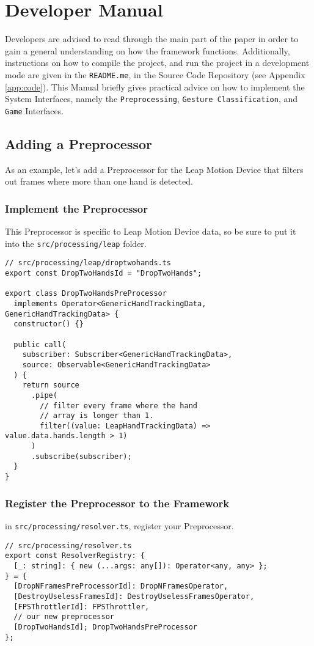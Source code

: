 \chapter{Developer Manual}
Developers are advised to read through the main part of the paper in order to gain a general understanding on how the framework functions. Additionally, instructions on how to compile the project, and run the project in a development mode are given in the \texttt{README.me}, in the Source Code Repository (see Appendix \ref{app:code}). This Manual briefly gives practical advice on how to implement the System Interfaces, namely the \texttt{Preprocessing}, \texttt{Gesture Classification}, and \texttt{Game} Interfaces.
\section{Adding a Preprocessor}
As an example, let's add a Preprocessor for the Leap Motion Device that filters out frames where more than one hand is detected.
\subsection{Implement the Preprocessor}
This Preprocessor is specific to Leap Motion Device data, so be sure to put it into the \texttt{src/processing/leap} folder.
\begin{verbatim}
// src/processing/leap/droptwohands.ts
export const DropTwoHandsId = "DropTwoHands";

export class DropTwoHandsPreProcessor
  implements Operator<GenericHandTrackingData, GenericHandTrackingData> {
  constructor() {}

  public call(
    subscriber: Subscriber<GenericHandTrackingData>,
    source: Observable<GenericHandTrackingData>
  ) {
    return source
      .pipe(
        // filter every frame where the hand
        // array is longer than 1.
        filter((value: LeapHandTrackingData) => value.data.hands.length > 1)
      )
      .subscribe(subscriber);
  }
}
\end{verbatim}

\subsection{Register the Preprocessor to the Framework}
in \texttt{src/processing/resolver.ts}, register your Preprocessor.
\begin{verbatim}
// src/processing/resolver.ts
export const ResolverRegistry: {
  [_: string]: { new (...args: any[]): Operator<any, any> };
} = {
  [DropNFramesPreProcessorId]: DropNFramesOperator,
  [DestroyUselessFramesId]: DestroyUselessFramesOperator,
  [FPSThrottlerId]: FPSThrottler,
  // our new preprocessor
  [DropTwoHandsId]; DropTwoHandsPreProcessor
};
\end{verbatim}


